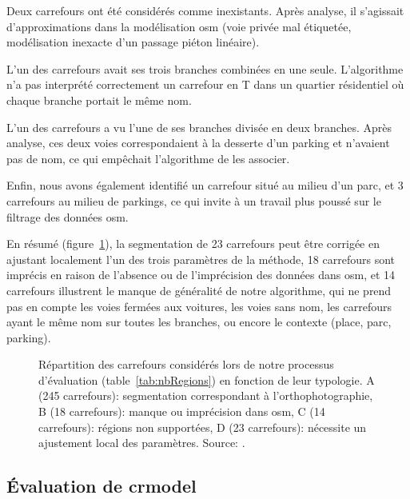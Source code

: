 \newpar{}

Deux carrefours ont été considérés comme inexistants. Après analyse, il s'agissait d'approximations dans la modélisation \gls{osm} (voie privée mal étiquetée, modélisation inexacte d'un passage piéton linéaire).

L’un des carrefours avait ses trois branches combinées en une seule. L'algorithme n'a pas interprété correctement un carrefour en T dans un quartier résidentiel où chaque branche portait le même nom.

L’un des carrefours a vu l’une de ses branches divisée en deux branches. Après analyse, ces deux voies correspondaient à la desserte d'un parking et n'avaient pas de nom, ce qui empêchait l'algorithme de les associer.

Enfin, nous avons également identifié un carrefour situé au milieu d'un parc, et 3 carrefours au milieu de parkings, ce qui invite à un travail plus poussé sur le filtrage des données \gls{osm}.

\newpar{}

En résumé (figure~\ref{fig:camembert}), la segmentation de 23 carrefours peut être corrigée en ajustant localement l'un des trois paramètres de la méthode, 18 carrefours sont imprécis en raison de l'absence ou de l'imprécision des données dans \gls{osm}, et 14 carrefours illustrent le manque de généralité de notre algorithme, qui ne prend pas en compte les voies fermées aux voitures, les voies sans nom, les carrefours ayant le même nom sur toutes les branches, ou encore le contexte (place, parc, parking).

\begin{figure}[ht]
    \centering
    \footnotesize
    \caption[Répartition des carrefours considérés lors du processus d'évaluation]{Répartition des carrefours considérés lors de notre processus d'évaluation (table~\ref{tab:nbRegions}) en fonction de leur typologie. A (245 carrefours): segmentation correspondant à l'orthophotographie, B (18 carrefours): manque ou imprécision dans \gls{osm}, C (14 carrefours): régions non supportées, D (23 carrefours): nécessite un ajustement local des paramètres. Source: \citep{Favreau2022}.}
    \label{fig:camembert}
\end{figure}

\subsection{Évaluation de crmodel}

